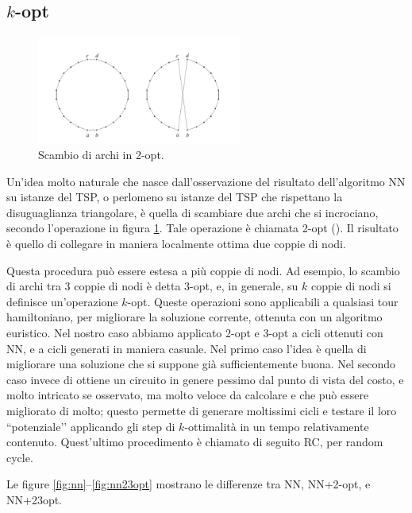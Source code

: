 \subsection{$k$-opt}
\begin{figure}
  \begin{center}
    \includegraphics[width=0.6\textwidth]{images/2opt}
    \caption{Scambio di archi in 2-opt.}
    \label{fig:2opt}
  \end{center}
\end{figure}
Un’idea molto naturale che nasce dall’osservazione del risultato dell’algoritmo NN su istanze del TSP, o perlomeno su istanze del TSP che rispettano la disuguaglianza triangolare, è quella di scambiare due archi che si incrociano, secondo l’operazione in figura \ref{fig:2opt}. Tale operazione è chiamata 2-opt (\citet*{croes1958method}). Il risultato è quello di collegare in maniera localmente ottima due coppie di nodi.

Questa procedura può essere estesa a più coppie di nodi. Ad esempio, lo scambio di archi tra 3 coppie di nodi è detta 3-opt, e, in generale, su $k$ coppie di nodi si definisce un’operazione $k$-opt. Queste operazioni sono applicabili a qualsiasi tour hamiltoniano, per migliorare la soluzione corrente, ottenuta con un algoritmo euristico. Nel nostro caso abbiamo applicato 2-opt e 3-opt a cicli ottenuti con NN, e a cicli generati in maniera casuale. Nel primo caso l’idea è quella di migliorare una soluzione che si suppone già sufficientemente buona. Nel secondo caso invece di ottiene un circuito in genere pessimo dal punto di vista del costo, e molto intricato se osservato, ma molto veloce da calcolare e che può essere migliorato di molto; questo permette di generare moltissimi cicli e testare il loro ``potenziale’’ applicando gli step di $k$-ottimalità in un tempo relativamente contenuto. Quest'ultimo procedimento è chiamato di seguito RC, per random cycle.

Le figure \ref{fig:nn}--\ref{fig:nn23opt} mostrano le differenze tra NN, NN+2-opt, e NN+23opt.

